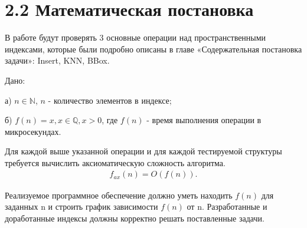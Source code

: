 \section{2.2 Математическая постановка}

В работе будут проверять 3 основные операции над пространственными индексами, которые были подробно описаны в главе «Содержательная постановка задачи»: Insert, KNN, BBox.

Дано:
\par а) $n \in \mathbb{N}$, $n$ - количество элементов в индексе;
\par б) $f(n) = x, x \in  \mathbb{Q}, x > 0$, где $f(n)$ - время выполнения операции в микросекундах.

Для каждой выше указанной операции и для каждой тестируемой структуры требуется вычислить аксиоматическую сложность алгоритма.
\vspace{1em}
\begin{align}
    f_{ax}(n) = O(f(n)).
\end{align}
\par\vspace{1em}

Реализуемое программное обеспечение должно уметь находить $f(n)$ для заданных n и строить график зависимости $f(n)$ от n.
Разработанные и доработанные индексы должны корректно решать поставленные задачи. 
